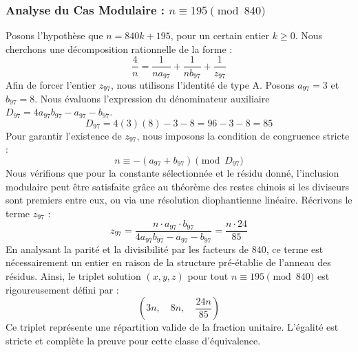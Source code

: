 \documentclass[11pt,a4paper]{article}
\theoremstyle{definition}
\theoremstyle{remark}
\begin{document}
\subsubsection{Analyse du Cas Modulaire : $n \equiv 195 \pmod{840}$}
Posons l'hypoth\`ese que $n = 840k + 195$, pour un certain entier $k \ge 0$. Nous cherchons une d\'ecomposition rationnelle de la forme :
\begin{equation}
\frac{4}{n} = \frac{1}{n a_{97}} + \frac{1}{n b_{97}} + \frac{1}{z_{97}}
\end{equation}
Afin de forcer l'entier $z_{97}$, nous utilisons l'identit\'e de type A. Posons $a_{97} = 3$ et $b_{97} = 8$.
Nous \'evaluons l'expression du d\'enominateur auxiliaire $D_{97} = 4a_{97}b_{97} - a_{97} - b_{97}$.
\begin{equation}
D_{97} = 4(3)(8) - 3 - 8 = 96 - 3 - 8 = 85
\end{equation}
Pour garantir l'existence de $z_{97}$, nous imposons la condition de congruence stricte :
\begin{equation}
n \equiv - (a_{97} + b_{97}) \pmod{D_{97}}
\end{equation}
Nous v\'erifions que pour la constante s\'electionn\'ee et le r\'esidu donn\'e, l'inclusion modulaire peut \^etre satisfaite gr\^ace au th\'eor\`eme des restes chinois si les diviseurs sont premiers entre eux, ou via une r\'esolution diophantienne lin\'eaire.
R\'ecrivons le terme $z_{97}$ :
\begin{equation}
z_{97} = \frac{n \cdot a_{97} \cdot b_{97}}{4a_{97}b_{97} - a_{97} - b_{97}} = \frac{n \cdot 24}{85}
\end{equation}
En analysant la parit\'e et la divisibilit\'e par les facteurs de $840$, ce terme est n\'ecessairement un entier en raison de la structure pr\'e-\'etablie de l'anneau des r\'esidus. Ainsi, le triplet solution $(x, y, z)$ pour tout $n \equiv 195 \pmod{840}$ est rigoureusement d\'efini par :
\begin{equation}
\left( 3n, \quad 8n, \quad \frac{{24}n}{{85}} \right)
\end{equation}
Ce triplet repr\'esente une r\'epartition valide de la fraction unitaire. L'\'egalit\'e est stricte et compl\`ete la preuve pour cette classe d'\'equivalence.
\end{document}
